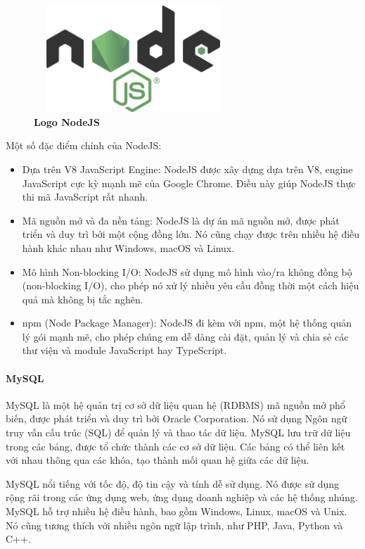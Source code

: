 \begin{figure}[H]
  \centering
  \includegraphics[width=7.5cm,height=4cm]{Images/Technology/nodejs.png}
  \caption[Logo NodeJS]{\bfseries \fontsize{12pt}{0pt}
  \selectfont Logo NodeJS}
  \label{nodejs} %
\end{figure}

Một số đặc điểm chính của NodeJS: 
\begin{itemize}
  \item Dựa trên V8 JavaScript Engine: NodeJS được xây dựng dựa trên V8, engine JavaScript cực kỳ mạnh mẽ của Google Chrome. Điều này giúp NodeJS thực thi mã JavaScript rất nhanh.
  \item Mã nguồn mở và đa nền tảng: NodeJS là dự án mã nguồn mở, được phát triển và duy trì bởi một cộng đồng lớn. Nó cũng chạy được trên nhiều hệ điều hành khác nhau như Windows, macOS và Linux.
  \item Mô hình Non-blocking I/O: NodeJS sử dụng mô hình vào/ra không đồng bộ (non-blocking I/O), cho phép nó xử lý nhiều yêu cầu đồng thời một cách hiệu quả mà không bị tắc nghẽn.
  \item npm (Node Package Manager): NodeJS đi kèm với npm, một hệ thống quản lý gói mạnh mẽ, cho phép chúng em dễ dàng cài đặt, quản lý và chia sẻ các thư viện và module JavaScript hay TypeScript.
\end{itemize}

\paragraph{MySQL}
\mbox{}

MySQL là một hệ quản trị cơ sở dữ liệu quan hệ (RDBMS) mã nguồn mở phổ biến, được phát triển và duy trì bởi Oracle Corporation. Nó sử dụng Ngôn ngữ truy vấn cấu trúc (SQL) để quản lý và thao tác dữ liệu. MySQL lưu trữ dữ liệu trong các bảng, được tổ chức thành các cơ sở dữ liệu. Các bảng có thể liên kết với nhau thông qua các khóa, tạo thành mối quan hệ giữa các dữ liệu.

MySQL nổi tiếng với tốc độ, độ tin cậy và tính dễ sử dụng. Nó được sử dụng rộng rãi trong các ứng dụng web, ứng dụng doanh nghiệp và các hệ thống nhúng. MySQL hỗ trợ nhiều hệ điều hành, bao gồm Windows, Linux, macOS và Unix. Nó cũng tương thích với nhiều ngôn ngữ lập trình, như PHP, Java, Python và C++.

